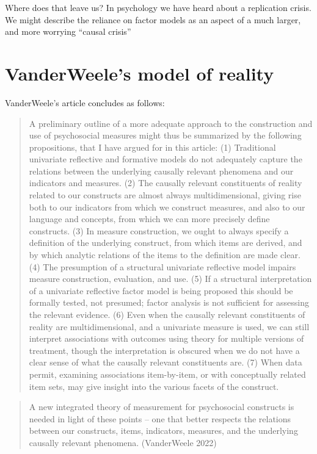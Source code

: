 \documentclass[
  singlecolumn]{report}
\begin{document}
Where does that leave us? In psychology we have heard about a
replication crisis. We might describe the reliance on factor models as
an aspect of a much larger, and more worrying ``causal crisis''

\hypertarget{vanderweeles-model-of-reality}{%
\section{VanderWeele's model of
reality}\label{vanderweeles-model-of-reality}}

VanderWeele's article concludes as follows:

\begin{quote}
A preliminary outline of a more adequate approach to the construction
and use of psychosocial measures might thus be summarized by the
following propositions, that I have argued for in this article: (1)
Traditional univariate reflective and formative models do not adequately
capture the relations between the underlying causally relevant phenomena
and our indicators and measures. (2) The causally relevant constituents
of reality related to our constructs are almost always multidimensional,
giving rise both to our indicators from which we construct measures, and
also to our language and concepts, from which we can more precisely
define constructs. (3) In measure construction, we ought to always
specify a definition of the underlying construct, from which items are
derived, and by which analytic relations of the items to the definition
are made clear. (4) The presumption of a structural univariate
reflective model impairs measure construction, evaluation, and use. (5)
If a structural interpretation of a univariate reflective factor model
is being proposed this should be formally tested, not presumed; factor
analysis is not sufficient for assessing the relevant evidence. (6) Even
when the causally relevant constituents of reality are multidimensional,
and a univariate measure is used, we can still interpret associations
with outcomes using theory for multiple versions of treatment, though
the interpretation is obscured when we do not have a clear sense of what
the causally relevant constituents are. (7) When data permit, examining
associations item-by-item, or with conceptually related item sets, may
give insight into the various facets of the construct.
\end{quote}

\begin{quote}
A new integrated theory of measurement for psychosocial constructs is
needed in light of these points -- one that better respects the
relations between our constructs, items, indicators, measures, and the
underlying causally relevant phenomena. (VanderWeele 2022)
\end{quote}
\end{document}
